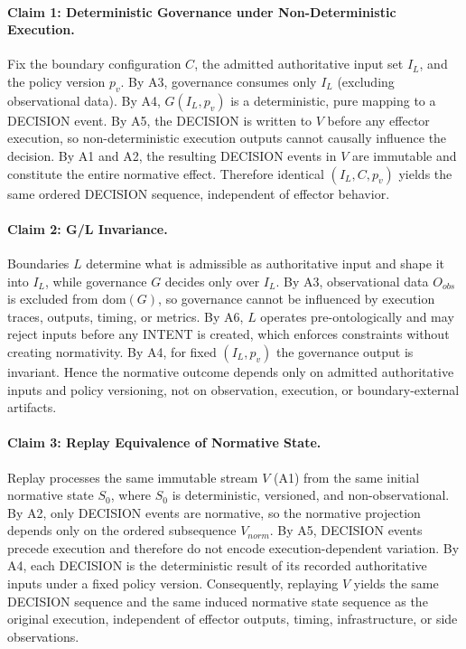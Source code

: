 \documentclass[11pt]{article}
\begin{document}
\paragraph{Claim 1: Deterministic Governance under Non-Deterministic Execution.}
Fix the boundary configuration $C$, the admitted authoritative input set $I_L$, and the policy version $p_v$. By A3, governance consumes only $I_L$ (excluding observational data). By A4, $G(I_L,p_v)$ is a deterministic, pure mapping to a DECISION event. By A5, the DECISION is written to $V$ before any effector execution, so non-deterministic execution outputs cannot causally influence the decision. By A1 and A2, the resulting DECISION events in $V$ are immutable and constitute the entire normative effect. Therefore identical $(I_L,C,p_v)$ yields the same ordered DECISION sequence, independent of effector behavior.

\paragraph{Claim 2: G/L Invariance.}
Boundaries $L$ determine what is admissible as authoritative input and shape it into $I_L$, while governance $G$ decides only over $I_L$. By A3, observational data $O_{obs}$ is excluded from $\mathrm{dom}(G)$, so governance cannot be influenced by execution traces, outputs, timing, or metrics. By A6, $L$ operates pre-ontologically and may reject inputs before any INTENT is created, which enforces constraints without creating normativity. By A4, for fixed $(I_L,p_v)$ the governance output is invariant. Hence the normative outcome depends only on admitted authoritative inputs and policy versioning, not on observation, execution, or boundary-external artifacts.

\paragraph{Claim 3: Replay Equivalence of Normative State.}
Replay processes the same immutable stream $V$ (A1) from the same initial normative state $S_0$, where $S_0$ is deterministic, versioned, and non-observational. By A2, only DECISION events are normative, so the normative projection depends only on the ordered subsequence $V_{norm}$. By A5, DECISION events precede execution and therefore do not encode execution-dependent variation. By A4, each DECISION is the deterministic result of its recorded authoritative inputs under a fixed policy version. Consequently, replaying $V$ yields the same DECISION sequence and the same induced normative state sequence as the original execution, independent of effector outputs, timing, infrastructure, or side observations.
\end{document}
